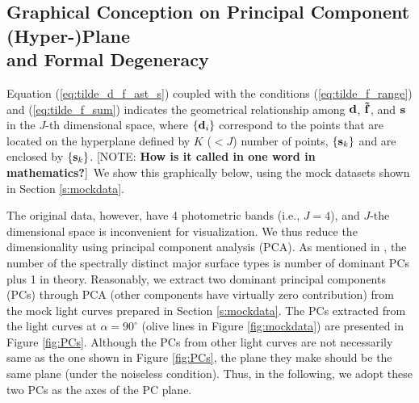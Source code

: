 \documentclass[iop,numberedappendix,apj,]{emulateapj}
\def\fast{\tilde f}
\def\memoYF#1{\color{red}[NOTE: {\bf #1}]\color{black}}
\begin{document}


\subsection{Graphical Conception on Principal Component (Hyper-)Plane\\and Formal Degeneracy}
\label{ss:PCplane}


Equation (\ref{eq:tilde_d_f_ast_s}) coupled with the conditions (\ref{eq:tilde_f_range}) and (\ref{eq:tilde_f_sum}) indicates the geometrical relationship among ${\bf d}$, ${\bf \fast }$, and ${\bf s}$ in the $J$-th dimensional space, where $\{{\bf d}_i\}$ correspond to the points that are located on the hyperplane defined by $K$ ($<J$) number of points, $\{{\bf s}_k\} $ and are enclosed by $\{{\bf s}_k \}$. \memoYF{How is it called in one word in mathematics?}\ 
We show this graphically below, using the mock datasets shown in Section \ref{s:mockdata}. 

The original data, however, have 4 photometric bands (i.e., $J=4$), and $J$-the dimensional space is inconvenient for visualization. 
We thus reduce the dimensionality using principal component analysis (PCA). 
As mentioned in \citet{Cowan2011}, the number of the spectrally distinct major surface types is number of dominant PCs plus 1 in theory. 
Reasonably, we extract two dominant principal components (PCs) through PCA (other components have virtually zero contribution) from the mock light curves prepared in Section \ref{s:mockdata}. 
The PCs extracted from the light curves at $\alpha = 90^{\circ }$ (olive lines in Figure \ref{fig:mockdata}) are presented in Figure \ref{fig:PCs}. 
Although the PCs from other light curves are not necessarily same as the one shown in Figure \ref{fig:PCs}, the plane they make should be the same plane (under the noiseless condition). Thus, in the following, we adopt these two PCs as the axes of the PC plane. 
\end{document}
